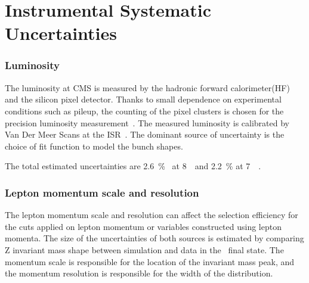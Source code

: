 \section{Instrumental Systematic Uncertainties} 


\subsubsection{Luminosity}

The luminosity at CMS is measured by the hadronic forward calorimeter(HF)
and the silicon pixel detector. Thanks to small dependence on experimental 
conditions such as pileup, the counting of the pixel clusters is chosen 
for the precision luminosity measurement~\cite{CMS-PAS-LUM-13-001}. 
The measured luminosity is calibrated by Van Der Meer Scans at the 
ISR~\cite{CMS-PAS-LUM-13-001}.
The dominant source of uncertainty is the choice of fit function 
to model the bunch shapes.  

The total estimated uncertainties are 2.6~\%~\cite{CMS-PAS-LUM-13-001} at 8~\TeV\ 
and 2.2~\% at 7~\TeV~\cite{Chatrchyan:2013oda}.  

\subsubsection{Lepton momentum scale and resolution}

The lepton momentum scale and resolution can affect the selection efficiency 
for the cuts applied on lepton momentum or variables constructed using 
lepton momenta. The size of the uncertainties of both sources is estimated 
by comparing Z invariant mass shape between simulation and data in the \SF\ 
final state. The momentum scale is responsible for the location of the 
invariant mass peak, and the momentum resolution is responsible for the width 
of the distribution. 

